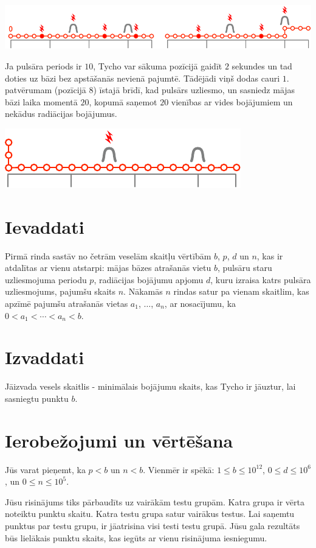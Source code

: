 \includegraphics[width=.8\textwidth]{img/sample1_2.pdf}

Ja pulsāra periods ir $10$, Tycho var sākuma pozīcijā gaidīt $2$ sekundes un tad doties uz bāzi bez apstāšanās nevienā pajumtē.
Tādējādi viņš dodas cauri $1.$ patvērumam (pozīcijā $8$) īstajā brīdī, kad pulsārs uzliesmo, un sasniedz mājas bāzi laika momentā $20$, kopumā saņemot $20$ vienības ar vides bojājumiem un nekādus radiācijas bojājumus.

\includegraphics[width=.4\textwidth]{img/sample3.pdf}

\section*{Ievaddati}

Pirmā rinda sastāv no četrām veselām skaitļu vērtībām $b$, $p$, $d$ un $n$, kas ir atdalītas ar vienu atstarpi:
mājas bāzes atrašanās vietu $b$,
pulsāru staru uzliesmojuma periodu $p$,
radiācijas bojājumu apjomu $d$, kuru izraisa katrs pulsāra uzliesmojums,
pajumšu skaits $n$.
Nākamās $n$ rindas satur pa vienam skaitlim, kas apzīmē pajumšu atrašanās vietas $a_1$, $\ldots$, $a_n$, ar nosacījumu, ka
$0<a_1<\cdots <a_n< b$. %

\section*{Izvaddati}

Jāizvada vesels skaitlis - minimālais bojājumu skaits, kas Tycho ir jāuztur, lai sasniegtu punktu $b$.


\section*{Ierobežojumi un vērtēšana}

Jūs varat pieņemt, ka
$p < b$ %
un
$n < b$. %
Vienmēr ir spēkā:
$1\leq b\leq 10^{12}$, %
$0\leq d \leq 10^6$, %
un
$0\leq n \leq 10^5$. %

Jūsu risinājums tiks pārbaudīts uz vairākām testu grupām. Katra grupa ir vērta noteiktu punktu skaitu.
Katra testu grupa satur vairākus testus.
Lai saņemtu punktus par testu grupu, ir jāatrisina visi testi testu grupā.
Jūsu gala rezultāts būs lielākais punktu skaits, kas iegūts ar vienu risinājuma iesniegumu.

